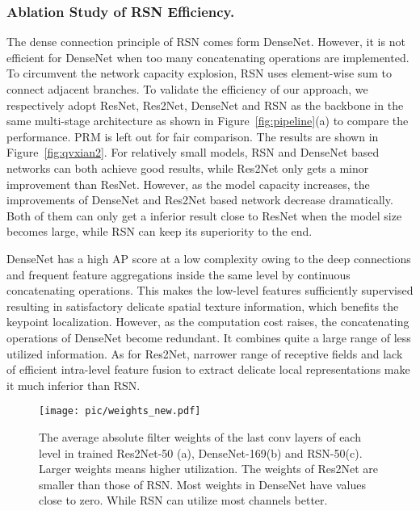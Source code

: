 \documentclass[runningheads]{llncs}
\begin{document}
\subsubsection{Ablation Study of RSN Efficiency.}\label{sec:high-efficiency}
The dense connection principle of RSN comes form DenseNet. However, it is not efficient for DenseNet when too many concatenating operations are implemented. To circumvent the network capacity explosion, RSN uses element-wise sum to connect adjacent branches. To validate the efficiency of our approach, we respectively adopt ResNet, Res2Net, DenseNet and RSN as the backbone in the same multi-stage architecture as shown in Figure~\ref{fig:pipeline}(a) to compare the performance. PRM is left out for fair comparison. The results are shown in Figure~\ref{fig:qvxian2}. For relatively small models, RSN and DenseNet based networks can both achieve good results, while Res2Net only gets a minor improvement than ResNet. However, as the model capacity increases, the improvements of DenseNet and Res2Net based network decrease dramatically. Both of them can only get a inferior result close to ResNet when the model size becomes large, while RSN can keep its superiority to the end. 




DenseNet has a high AP score at a low complexity owing to the deep connections and frequent feature aggregations inside the same level by continuous concatenating operations. This makes the low-level features sufficiently supervised resulting in satisfactory delicate spatial texture information, which benefits the keypoint localization. However, as the computation cost raises, the concatenating operations of DenseNet become redundant. It combines quite a large range of less utilized information. As for Res2Net, narrower range of receptive fields and lack of efficient intra-level feature fusion to extract delicate local representations make it much inferior than RSN.


\begin{figure}[h]

 \centering
\texttt{[image: pic/weights\_new.pdf]} \caption{The average absolute filter weights of the last conv layers of each level in trained Res2Net-50 (a), DenseNet-169(b) and RSN-50(c). Larger weights means higher utilization. The weights of Res2Net are smaller than those of RSN. Most weights in DenseNet have values close to zero. While RSN can utilize most channels better.} \label{fig:weights} \end{figure}
\end{document}
